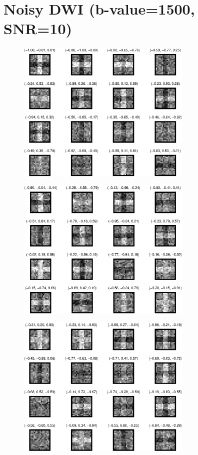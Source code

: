 \documentclass[10pt]{article}
\begin{document}
\section{Noisy DWI (b-value=1500, SNR=10)}
\begin{figure}[H]
  \centering
  \includegraphics[width=0.75\textwidth]{figures/DWI01[SNR=10].eps}
\end{figure}
\begin{figure}[H]
  \centering
  \includegraphics[width=0.75\textwidth]{figures/DWI02[SNR=10].eps}
\end{figure}
\begin{figure}[H]
  \centering
  \includegraphics[width=0.75\textwidth]{figures/DWI03[SNR=10].eps}
\end{figure}
\end{document}
